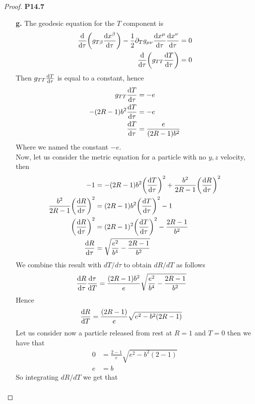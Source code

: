 \documentclass[11pt]{article}
\theoremstyle{definition}
\begin{document}
\begin{proof}{\textbf{P14.7}}
\begin{itemize}
\cleardoublepage
\item [\textbf{g.}]
The geodesic equation for the $T$ component is 
\begin{align*}
    \dv{\tau}(g_{T\beta}\dv{x^\beta}{\tau}) - \frac{1}{2}\partial_T
    g_{\mu\nu}\dv{x^\mu}{\tau}\dv{x^\nu}{\tau} &= 0\\
    \dv{\tau}(g_{TT}\dv{T}{\tau}) &= 0
\end{align*}
Then $g_{TT}\dv{T}{\tau}$ is equal to a constant, hence
\begin{align*}
    g_{TT}\dv{T}{\tau} &= -e\\
    -(2R - 1)b^2\dv{T}{\tau} &= -e\\
    \dv{T}{\tau} &= \frac{e}{(2R - 1)b^2}
\end{align*}
Where we named the constant $-e$.
\\
Now, let us consider the metric equation for a particle with no $y, z$ velocity,
then
\begin{align*}
    -1 &= -(2R - 1)b^2 \bigg(\dv{T}{\tau}\bigg)^2
    + \frac{b^2}{2R - 1}\bigg(\dv{R}{\tau}\bigg)^2\\
    \frac{b^2}{2R - 1}\bigg(\dv{R}{\tau}\bigg)^2
    &= (2R - 1)b^2 \bigg(\dv{T}{\tau}\bigg)^2 - 1\\
    \bigg(\dv{R}{\tau}\bigg)^2 &=
    (2R - 1)^2 \bigg(\dv{T}{\tau}\bigg)^2 - \frac{2R - 1}{b^2}\\
    \dv{R}{\tau} &= \sqrt{\frac{e^2}{b^4} - \frac{2R - 1}{b^2}}
\end{align*}
We combine this result with $dT/d\tau$ to obtain $dR/dT$ as follows
\begin{align*}
    \dv{R}{\tau}\dv{\tau}{T}
    &= \frac{(2R - 1)b^2}{e}\sqrt{\frac{e^2}{b^4} - \frac{2R - 1}{b^2}}
\end{align*}
Hence
\begin{align*}
    \dv{R}{T} &= \frac{(2R - 1)}{e}\sqrt{e^2 - b^2(2R - 1)}
\end{align*}
Let us consider now a particle released from rest at $R = 1$ and $T = 0$ then
we have that
\begin{align*}
    0 &= \frac{2 - 1}{e}\sqrt{e^2 - b^2(2 - 1)}\\
    e &= b
\end{align*}
So integrating $dR/dT$ we get that
\begin{align*}

\end{align*}
\end{itemize}
\end{proof}
\end{document}
